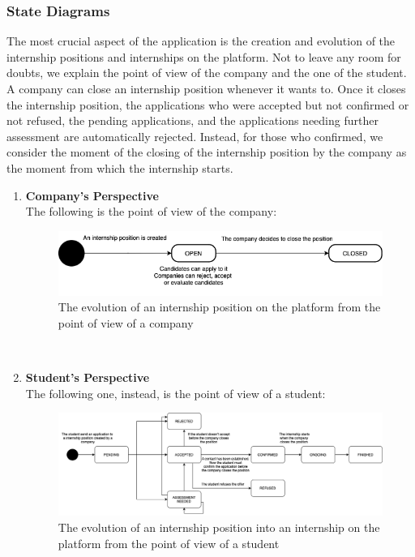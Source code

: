     \subsubsection{State Diagrams}
        The most crucial aspect of the application is the creation and evolution of the internship positions and internships on the platform. Not to leave any room for doubts, we explain the point of view of the company and the one of the student.
        \\
        A company can close an internship position whenever it wants to. Once it closes the internship position, the applications who were accepted but not confirmed or not refused, the pending applications, and the applications needing further assessment are automatically rejected. Instead, for those who confirmed, we consider the moment of the closing of the internship position by the company as the moment from which the internship starts.
        \\
        \begin{enumerate}[label=\textbullet, itemsep=0em]
            \item \textbf {Company's Perspective}
            \\The following is the point of view of the company:
            \begin{figure}[h!]
                \centering
                \includegraphics[width=1\textwidth]{RASD/Images/CompanyPOV.png}
                \caption{The evolution of an internship position on the platform from the point of view of a company}
                \label{fig:example}
            \end{figure}
            \\
        
            \item \textbf {Student's Perspective}
            \\The following one, instead, is the point of view of a student:
            \begin{figure}[h!]
                \centering
                \includegraphics[width=1\textwidth]{RASD/Images/StudentPOV.png}
                \caption{The evolution of an internship position into an internship on the platform from the point of view of a student}
                \label{fig:example}
            \end{figure}

        \end{enumerate}
        
